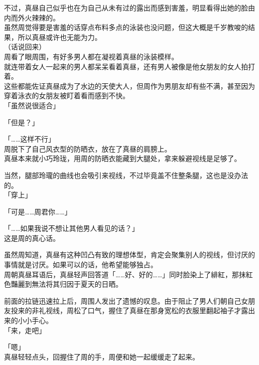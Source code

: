 不过，真昼自己似乎也在为自己从未有过的露出而感到害羞，明显看得出她的脸由内而外火辣辣的。\\

虽然周觉得要是害羞的话穿点布料多点的泳装也没问题，但这大概是千岁教唆的结果，所以真昼或许也无能为力。\\

（话说回来）\\

周看了眼周围，有好多男人都在凝视着真昼的泳装模样。\\

就连带着女人一起来的男人都呆呆看着真昼，还有男人被像是他女朋友的女人拍打着。\\

这些都能佐证真昼成为了水边的天使大人，但周作为男朋友却有些不满，甚至因为穿着泳衣的女朋友被盯着看而感到不快。\\

「虽然说很适合」

「但是？」

「……这样不行」\\

周脱下了自己风衣型的防晒衣，放在了真昼的肩膀上。\\

真昼本来就小巧玲珑，用周的防晒衣能藏到大腿处，拿来躲避视线是足够了。

当然，腿部玲瓏的曲线也会吸引来视线，不过毕竟盖不住整条腿，这也是没办法的。\\

「穿上」

「可是……周君你……」

「……如果我说不想让其他男人看见的话？」\\

这是周的真心话。

虽然周知道，真昼有这种凹凸有致的理想体型，肯定会聚集别人的视线，但讨厌的事情就是讨厌。如果可以的话，他希望能够独占。\\

周朝真昼耳语后，真昼轻声回答道「……好、好的……」同时脸染上了緋紅，那抹紅色豔麗到無法将其归因于夏天的日晒。

前面的拉链迅速拉上后，周围人发出了遗憾的叹息。由于阻止了男人们朝自己女朋友投来的非礼视线，周松了口气，握住了真昼在那身宽松的衣服里翻起袖子才露出来的小小手心。\\

「来，走吧」

「嗯」\\

真昼轻轻点头，回握住了周的手，周便和她一起缓缓走了起来。

